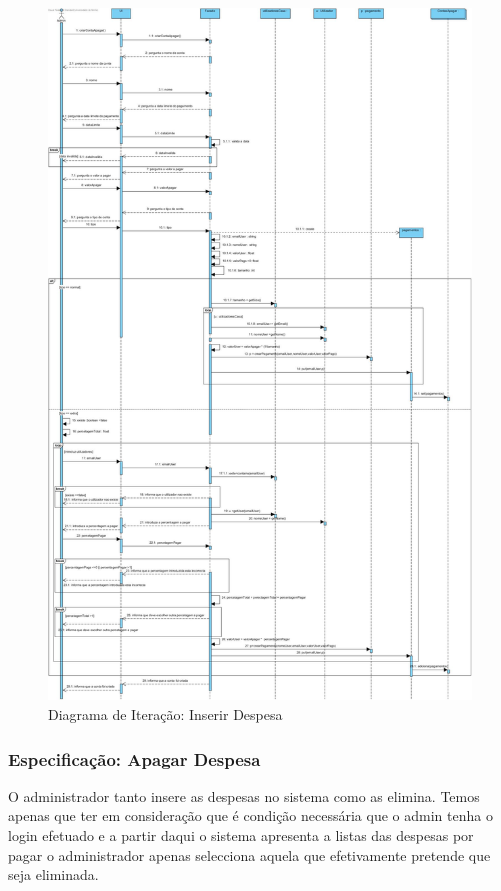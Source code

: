\begin{figure}[htb!]
	\centering
	\includegraphics[scale=0.299999]{imagens/diagramaIt/AdminCriaContaApagar}  
	\caption{Diagrama de Iteração: Inserir Despesa}  
\end{figure}

\newpage \clearpage

\subsubsection{Especificação: Apagar Despesa}

O administrador tanto insere as despesas no sistema como as elimina. Temos apenas que ter em consideração que é condição necessária que o admin tenha o login efetuado e a partir daqui o sistema apresenta a listas das despesas por pagar o administrador apenas selecciona aquela que efetivamente pretende que seja eliminada.

